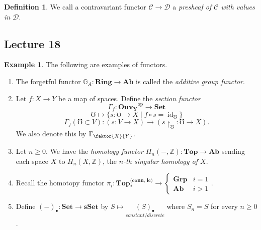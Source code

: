 \documentclass[10pt,letterpaper,cm]{nupset}
\theoremstyle{definition}
\newtheorem*{definition}{Definition}
\newtheorem{exmp}{Example}
\newcommand{\G}{\mathbb G}
\newcommand{\Z}{\mathbb Z}
\newcommand{\1}{\mathbf{1}}
\renewcommand{\c}{\mathscr{C}}
\renewcommand{\d}{\mathscr{D}}
\newcommand{\0}{\vec 0}
\DeclareMathOperator{\id}{id}
\DeclareMathOperator{\op}{op}
\begin{document}
\begin{definition}
We call a contravariant functor $\c \to \d$ a \textit{presheaf of $\c$ with values in $\d$}.
\end{definition}

\subsection{Lecture 18}

\begin{exmp}  The following are examples of functors.
\begin{enumerate}
\item The forgetful functor $\G_A: \mathbf{Ring} \to \mathbf{Ab}$ is called the \textit{additive group functor}.
\item Let $f: X \to Y$ be a map of spaces. Define the \textit{section functor}
 $$\Gamma_f: \mathbf{Ouv_Y}^{\op} \to \mathbf{Set}$$
$$\mho \mapsto \{s: \mho \to X \mid f \circ s = \id_{\mho}\}$$
$$\Gamma_f(\mho \subset V) : (s: V \to X) \to (s\restriction_{\mho} : \mho \to X).$$ We also denote this by $\Gamma_{\faktor{X}{Y}}$.
\item Let $n\geq 0$. We have the \textit{homology functor} $H_n(-, \Z) : \mathbf{Top} \to \mathbf{Ab}$ sending each space $X$ to $H_n(X, \Z)$, the \textit{$n$-th singular homology of $X$}.
\item Recall the homotopy functor $\pi_i : \mathbf{Top_{\ast}^{\text{(conn, lc)}}} \to
 \begin{cases} 
\mathbf{Grp} & i = 1 \\
\mathbf{Ab} & i >1
\end{cases}.$
\item Define $(-)_{\bullet} : \mathbf{Set} \to {\mathbf{sSet}}$ by $S \mapsto \underset{\textit{constant/discrete}}{(S)_{\bullet}}$ where $S_n =S$ for every $n\geq 0$.


\end{enumerate}
\end{exmp}
\end{document}
